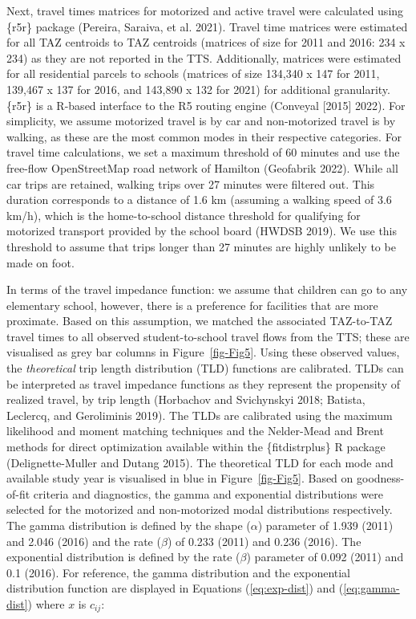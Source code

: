\documentclass[
default
]{sn-jnl}
\begin{document}
Next, travel times matrices for motorized and active travel were
calculated using \{r5r\} package (Pereira, Saraiva, et al. 2021). Travel
time matrices were estimated for all TAZ centroids to TAZ centroids
(matrices of size for 2011 and 2016: 234 x 234) as they are not reported
in the TTS. Additionally, matrices were estimated for all residential
parcels to schools (matrices of size 134,340 x 147 for 2011, 139,467 x
137 for 2016, and 143,890 x 132 for 2021) for additional granularity.
\{r5r\} is a R-based interface to the R5 routing engine (Conveyal
{[}2015{]} 2022). For simplicity, we assume motorized travel is by car
and non-motorized travel is by walking, as these are the most common
modes in their respective categories. For travel time calculations, we
set a maximum threshold of 60 minutes and use the free-flow
OpenStreetMap road network of Hamilton (Geofabrik 2022). While all car
trips are retained, walking trips over 27 minutes were filtered out.
This duration corresponds to a distance of 1.6 km (assuming a walking
speed of 3.6 km/h), which is the home-to-school distance threshold for
qualifying for motorized transport provided by the school board (HWDSB
2019). We use this threshold to assume that trips longer than 27 minutes
are highly unlikely to be made on foot.

In terms of the travel impedance function: we assume that children can
go to any elementary school, however, there is a preference for
facilities that are more proximate. Based on this assumption, we matched
the associated TAZ-to-TAZ travel times to all observed student-to-school
travel flows from the TTS; these are visualised as grey bar columns in
Figure~\ref{fig-Fig5}. Using these observed values, the
\emph{theoretical} trip length distribution (TLD) functions are
calibrated. TLDs can be interpreted as travel impedance functions as
they represent the propensity of realized travel, by trip length
(Horbachov and Svichynskyi 2018; Batista, Leclercq, and Geroliminis
2019). The TLDs are calibrated using the maximum likelihood and moment
matching techniques and the Nelder-Mead and Brent methods for direct
optimization available within the \{fitdistrplus\} R package
(Delignette-Muller and Dutang 2015). The theoretical TLD for each mode
and available study year is visualised in blue in Figure~\ref{fig-Fig5}.
Based on goodness-of-fit criteria and diagnostics, the gamma and
exponential distributions were selected for the motorized and
non-motorized modal distributions respectively. The gamma distribution
is defined by the shape (\(\alpha\)) parameter of 1.939 (2011) and 2.046
(2016) and the rate (\(\beta\)) of 0.233 (2011) and 0.236 (2016). The
exponential distribution is defined by the rate (\(\beta\)) parameter of
0.092 (2011) and 0.1 (2016). For reference, the gamma distribution and
the exponential distribution function are displayed in Equations
(\ref{eq:exp-dist}) and (\ref{eq:gamma-dist}) where \(x\) is \(c_{ij}\):
\end{document}
